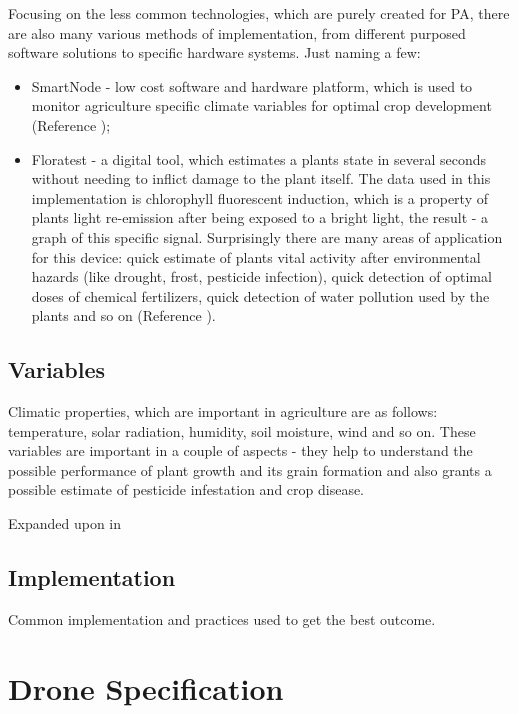 \documentclass[11pt,a5paper,footinclude=true,headinclude=true, oneside]{scrbook}
\begin{document}
Focusing on the less common technologies, which are purely created for PA, there are also many various methods of implementation, from different purposed software solutions to specific hardware systems. Just naming a few:

\begin{itemize}
    \item SmartNode - low cost software and hardware platform, which is used to monitor agriculture specific climate variables for optimal crop development (Reference \cite{nunez_v_design_2017});
    \item Floratest - a digital tool, which estimates a plants state in several seconds without needing to inflict damage to the plant itself. The data used in this implementation is chlorophyll fluorescent induction, which is a property of plants light re-emission after being exposed to a bright light, the result - a graph of this specific signal. Surprisingly there are many areas of application for this device: quick estimate of plants vital activity after environmental hazards (like drought, frost, pesticide infection), quick detection of optimal doses of chemical fertilizers, quick detection of water pollution used by the plants and so on (Reference \cite{palagin_data_2011}).
\end{itemize}

    
\section{Variables}

Climatic properties, which are important in agriculture are as follows: temperature, solar radiation, humidity, soil moisture, wind and so on. These variables are important in a couple of aspects - they help to understand the possible performance of plant growth and its grain formation and also grants a possible estimate of pesticide infestation and crop disease.
    
Expanded upon in \cite{lokhande_effective_2021}
    
\section{Implementation}

Common implementation and practices used to get the best outcome.

\chapter{Drone Specification}
\end{document}

